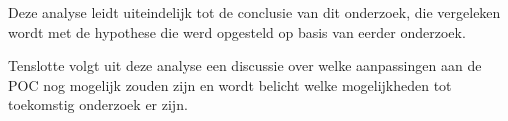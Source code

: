 Deze analyse leidt uiteindelijk tot de conclusie van dit onderzoek, die vergeleken wordt met de hypothese die werd opgesteld op basis van eerder onderzoek.

Tenslotte volgt uit deze analyse een discussie over welke aanpassingen aan de POC nog mogelijk zouden zijn en wordt belicht welke mogelijkheden tot toekomstig onderzoek er zijn.





